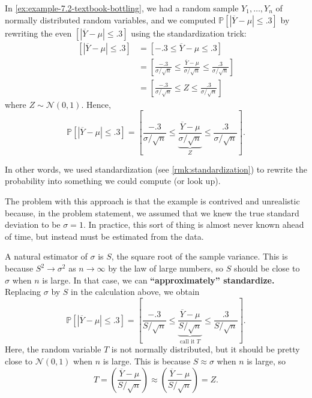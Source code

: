 \documentclass[10pt]{article}
\theoremstyle{definition}
\newcommand{\1}[1]{\textbf{1}_{\left[#1\right]}} %
\def\P{\mathbb{P}} %
\begin{document}
In \cref{ex:example-7.2-textbook-bottling}, we had a random sample
$Y_{1},\ldots,Y_{n}$ of normally distributed random variables, and we computed
$\P\left[\left| \overline{Y}-\mu \right| \leq .3\right]$ by rewriting the even
$\left[ \left| \overline{Y}-\mu \right| \leq .3\right]$ using the
standardization trick:
\begin{align*}
  \left[ \left| \overline{Y}-\mu \right| \leq .3\right] 
  &= \left[ -.3 \leq \overline{Y} -\mu \leq .3\right]\\
  &= \left[ \frac{-.3}{\sigma/\sqrt{n}} \leq \frac{\overline{Y} -\mu}{\sigma/\sqrt{n}} \leq \frac{.3}{\sigma/\sqrt{n}}\right]\\
  &= \left[ \frac{-.3}{\sigma/\sqrt{n}} \leq Z \leq \frac{.3}{\sigma/\sqrt{n}}\right]
\end{align*}
where $Z\sim \mathcal{N}(0,1)$. Hence,
\begin{equation}\label{eq:5}
  \P\left[\left| \overline{Y}-\mu \right| \leq .3\right]
  = \left[ \frac{-.3}{\sigma/\sqrt{n}} \leq \underbrace{\frac{\overline{Y}
        -\mu}{\sigma/\sqrt{n}}}_{Z} \leq \frac{.3}{\sigma/\sqrt{n}}\right].
\end{equation}

In other words, we used standardization (see \cref{rmk:standardization}) to
rewrite the probability into something we could compute (or look up).

The problem with this approach is that the example is contrived and
unrealistic because, in the problem statement, we assumed that we knew the
true standard deviation to be $\sigma=1$. In practice, this sort of thing is
almost never known ahead of time, but instead must be estimated from the data.

A natural estimator of $\sigma$ is $S$, the square root of the sample
variance. This is because $S^{2} \to \sigma^{2}$ as $n\to \infty$ by the law
of large numbers, so $S$ should be close to $\sigma$ when $n$ is large. In
that case, we can \textbf{``approximately'' standardize.} Replacing $\sigma$
by $S$ in the calculation above, we obtain
\begin{equation*}
  \P\left[\left| \overline{Y}-\mu \right| \leq .3\right]
  = \left[ \frac{-.3}{S/\sqrt{n}} \leq \underbrace{\frac{\overline{Y}
        -\mu}{S/\sqrt{n}}}_{\text{call it }T} \leq \frac{.3}{S/\sqrt{n}}\right].
\end{equation*}
Here, the random variable $T$ is not normally distributed, but it should be
pretty close to $\mathcal{N}(0,1)$ when $n$ is large. This is because
$S\approx \sigma$ when $n$ is large, so
\begin{equation*}
  T 
  = \left( \frac{\overline{Y}-\mu}{S/\sqrt{n}} \right) 
  \approx \left( \frac{\overline{Y}-\mu}{S/\sqrt{n}} \right)
  = Z.
\end{equation*}
\end{document}
